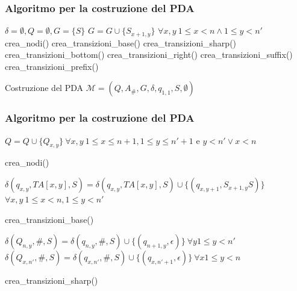 \documentclass{beamer}
\begin{document}
\begin{frame}
\frametitle{Algoritmo per la costruzione del PDA}
\begin{algorithm}[H]
\begin{algorithmic}[1]
	\STATE $\delta = \emptyset, Q = \emptyset, G = \{S\}$
	\STATE $G = G \cup \{S_{x+1,y}\}$ $\forall x,y\ 1\leq x < n \wedge 1 \leq y < n'$
	\STATE crea\_nodi()
	\STATE crea\_transizioni\_base()
	\STATE crea\_transizioni\_sharp()
	\STATE crea\_transizioni\_bottom()
	\STATE crea\_transizioni\_right()
	\STATE crea\_transizioni\_suffix()
	\STATE crea\_transizioni\_prefix()
\end{algorithmic}
\caption{Costruzione del PDA $\mathcal{M} = (Q,A_\#,G,\delta,q_{1,1},S,\emptyset)$}
\end{algorithm}

\end{frame}

\begin{frame}
\frametitle{Algoritmo per la costruzione del PDA}
\begin{algorithm}[H]
\begin{algorithmic}[1]
	\STATE $Q = Q \cup \{Q_{x,y}\}\ \forall x,y\ 1 \leq x \leq n+1,1\leq y \leq n'+1$ e $y<n' \vee x < n$
\end{algorithmic}
\caption{crea\_nodi()}
\end{algorithm}

\begin{algorithm}[H]
\begin{algorithmic}[1]
	\STATE $\delta(q_{x,y},TA[x,y],S) = \delta(q_{x,y},TA[x,y],S) \cup \{(q_{x,y+1},S_{x+1,y}S)\}$
	\STATE $\forall x,y\ 1\leq x < n, 1\leq y < n'$
\end{algorithmic}
\caption{crea\_transizioni\_base()}
\end{algorithm}

\begin{algorithm}[H]
\begin{algorithmic}[1]
	\STATE $\delta(Q_{n,y},\#,S) = \delta(q_{n,y},\#,S) \cup \{(q_{n+1,y},\epsilon)\}\ \forall y 1 \leq y < n'$
	\STATE $\delta(Q_{x,n'},\#,S) = \delta(q_{x,n'},\#,S) \cup \{(q_{x,n'+1},\epsilon)\}\ \forall x 1 \leq y < n$
\end{algorithmic}
\caption{crea\_transizioni\_sharp()}
\end{algorithm}

\end{frame}
\end{document}
